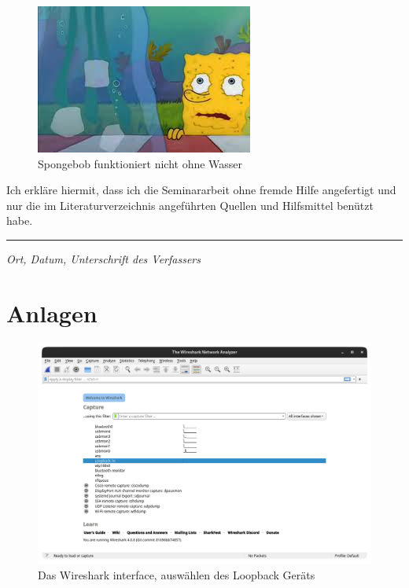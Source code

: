\documentclass[12pt]{article}
\begin{document}
\begin{figure}[h]
	\centering
	\includegraphics[scale=0.5]{Bilder/Spongebob}
	\caption{Spongebob funktioniert nicht ohne Wasser\cite{spongebob}}
	\label{fig:figure99}
\end{figure}








\newpage
 \listoffigures
 \listoftables
\newpage



\newpage
\fancyhead{}
\renewcommand{\headrulewidth}{0pt}
\vspace*{40pt}
\begin{center}
	\large{Ich erkläre hiermit, dass ich die Seminararbeit ohne fremde Hilfe angefertigt und nur die im Literaturverzeichnis angeführten Quellen und Hilfsmittel benützt habe.}
	\vspace{40pt}
	\hrule
\end{center}
	\scriptsize{\textit{Ort, Datum, Unterschrift des Verfassers}}

\newpage
\pagestyle{empty}
\centering
\vspace*{200pt}
\Huge{\section{Anlagen}}
\newpage

\begin{figure}[h]
	\centering
	\includegraphics[scale=0.3]{Bilder/Anlagen_1}
	\caption{Das Wireshark interface, auswählen des Loopback Geräts \cite{screenshots-self}}
	\label{fig:figure30}
\end{figure}
\end{document}
